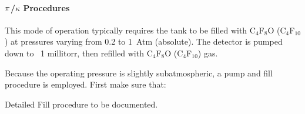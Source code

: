 {\paragraph{$\bf{\pi}$/$\kappa$ Procedures}
This mode of operation typically requires the tank to be filled with C$_4$F$_8$O
(C$_4$F$_{10}$) at pressures varying from 0.2 to 1~Atm (absolute). The detector
is pumped down to ~1 millitorr, then refilled with C$_4$F$_8$O (C$_4$F$_{10}$)
gas.

Because the operating pressure is slightly subatmospheric, a pump and fill
procedure is employed.  First make sure that:

{
\color{red}
Detailed Fill procedure to be documented.
}


}
